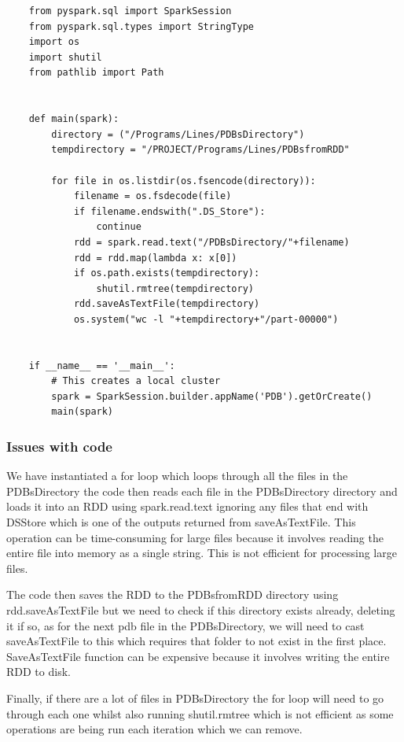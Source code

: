 \documentclass[]{final_report}
\begin{document}
\begin{lstlisting}
    from pyspark.sql import SparkSession
    from pyspark.sql.types import StringType
    import os
    import shutil
    from pathlib import Path


    def main(spark):
        directory = ("/Programs/Lines/PDBsDirectory")
        tempdirectory = "/PROJECT/Programs/Lines/PDBsfromRDD"

        for file in os.listdir(os.fsencode(directory)):
            filename = os.fsdecode(file)
            if filename.endswith(".DS_Store"):
                continue
            rdd = spark.read.text("/PDBsDirectory/"+filename)
            rdd = rdd.map(lambda x: x[0])
            if os.path.exists(tempdirectory):
                shutil.rmtree(tempdirectory)
            rdd.saveAsTextFile(tempdirectory)
            os.system("wc -l "+tempdirectory+"/part-00000")


    if __name__ == '__main__':
        # This creates a local cluster
        spark = SparkSession.builder.appName('PDB').getOrCreate()
        main(spark)
\end{lstlisting}

\clearpage

\subsubsection{Issues with code}
We have instantiated a for loop which loops through all the files in the PDBsDirectory the code then reads each file in the PDBsDirectory directory and loads it into an RDD using spark.read.text ignoring any files that end with DSStore which is one of the outputs returned from saveAsTextFile. This operation can be time-consuming for large files because it involves reading the entire file into memory as a single string. This is not efficient for processing large files.

The code then saves the RDD to the PDBsfromRDD directory using rdd.saveAsTextFile but we need to check if this directory exists already, deleting it if so, as for the next pdb file in the PDBsDirectory, we will need to cast saveAsTextFile to this which requires that folder to not exist in the first place. SaveAsTextFile function can be expensive because it involves writing the entire RDD to disk.

Finally, if there are a lot of files in PDBsDirectory the for loop will need to go through each one whilst also running shutil.rmtree which is not efficient as some operations are being run each iteration which we can remove.
\end{document}
